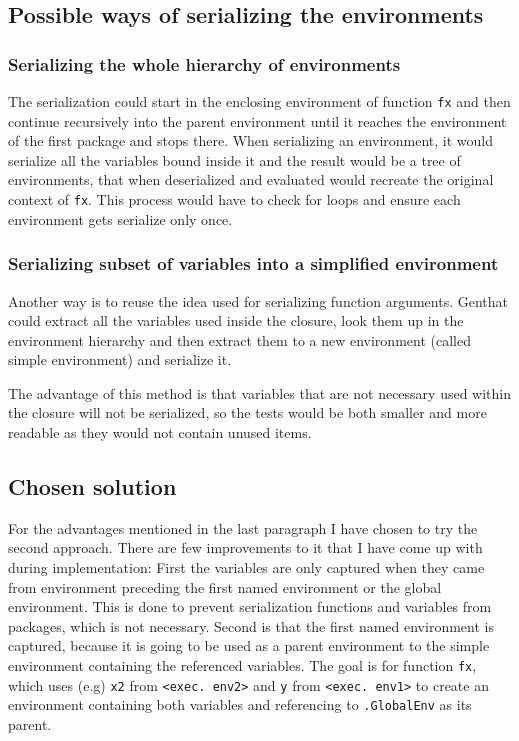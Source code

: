 \documentclass[thesis=B,english]{FITthesis}[2012/10/20]
\begin{document}
\subsection{Possible ways of serializing the environments}

\subsubsection{Serializing the whole hierarchy of environments}
The serialization could start in the enclosing environment of function \verb|fx| and then continue recursively into the parent environment until it reaches the environment of the first package and stops there. When serializing an environment, it would serialize all the variables bound inside it and the result would be a tree of environments, that when deserialized and evaluated would recreate the original context of \verb|fx|. This process would have to check for loops and ensure each environment gets serialize only once.

\subsubsection{Serializing subset of variables into a simplified environment}
Another way is to reuse the idea used for serializing function arguments. Genthat could extract all the variables used inside the closure, look them up in the environment hierarchy and then extract them to a new environment (called simple environment) and serialize it.

The advantage of this method is that variables that are not necessary used within the closure will not be serialized, so the tests would be both smaller and more readable as they would not contain unused items.

\subsection{Chosen solution}
For the advantages mentioned in the last paragraph I have chosen to try the second approach. There are few improvements to it that I have come up with during implementation: First the variables are only captured when they came from environment preceding the first named environment or the global environment. This is done to prevent serialization functions and variables from packages, which is not necessary. Second is that the first named environment is captured, because it is going to be used as a parent environment to the simple environment containing the referenced variables. The goal is for function \verb|fx|, which uses (e.g) \verb|x2| from \verb|<exec. env2>| and \verb|y| from \verb|<exec. env1>| to create an environment containing both variables and referencing to \verb|.GlobalEnv| as its parent. 
\end{document}

